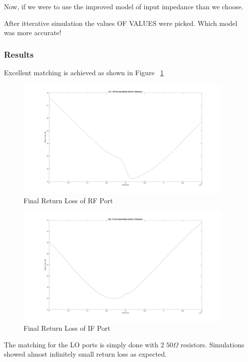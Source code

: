 \documentclass{article}                                                         %
\begin{document}
Now, if we were to use the improved model of input impedance than we choose.

After itterative simulation the values OF VALUES were picked. Which model was more accurate!

\subsubsection{Results}
Excellent matching is achieved as shown in Figure ~\ref{fig:matS11}
\begin{figure}[H]
  \centering
  \includegraphics[width=0.95\textwidth] {Plots/S11.jpg}
  \caption{Final Return Loss of RF Port}
    \label{fig:matS11}
\end{figure}
\begin{figure}[H]
  \centering
  \includegraphics[width=0.95\textwidth] {Plots/S22.jpg}
  \caption{Final Return Loss of IF Port}
    \label{fig:matS22}
\end{figure}

The matching for the LO ports is simply done with 2 $50 \Omega$ resistors. Simulations
showed almost infinitely small return loss as expected.
\end{document}
